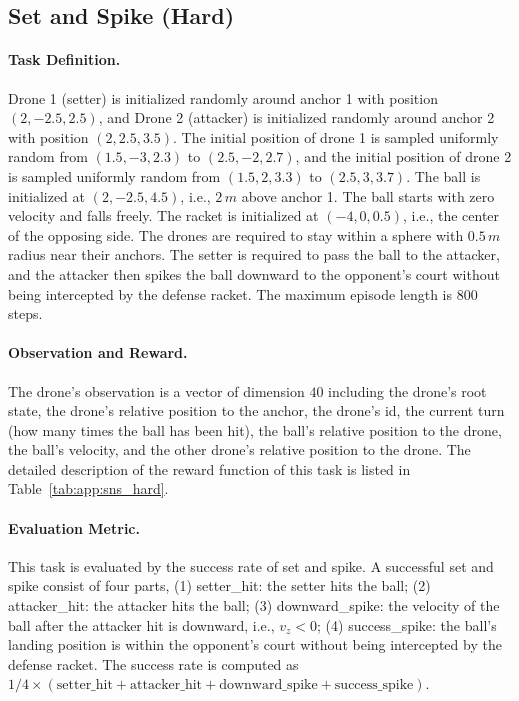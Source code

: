 \subsection{Set and Spike (Hard)}

\paragraph{Task Definition.}
Drone 1 (setter) is initialized randomly around anchor 1 with position $(2, -2.5, 2.5)$, and Drone 2 (attacker) is initialized randomly around anchor 2 with position $(2, 2.5, 3.5)$. The initial position of drone 1 is sampled uniformly random from $(1.5, -3, 2.3)$ to $(2.5, -2, 2.7)$, and the initial position of drone 2 is sampled uniformly random from $(1.5, 2, 3.3)$ to $(2.5, 3, 3.7)$. The ball is initialized at $(2, -2.5, 4.5)$, i.e., $2\,m$ above anchor 1. The ball starts with zero velocity and falls freely. The racket is initialized at $(-4, 0, 0.5)$, i.e., the center of the opposing side.
The drones are required to stay within a sphere with $0.5\,m$ radius near their anchors. The setter is required to pass the ball to the attacker, and the attacker then spikes the ball downward to the opponent's court without being intercepted by the defense racket. The maximum episode length is 800 steps.

\paragraph{Observation and Reward.}
The drone's observation is a vector of dimension $40$ including the drone's root state, the drone's relative position to the anchor, the drone's id, the current turn (how many times the ball has been hit), the ball's relative position to the drone, the ball's velocity, and the other drone's relative position to the drone. The detailed description of the reward function of this task is listed in Table~\ref{tab:app:sns_hard}.

\paragraph{Evaluation Metric.}
This task is evaluated by the success rate of set and spike. A successful set and spike consist of four parts, (1) setter\_hit: the setter hits the ball; (2) attacker\_hit: the attacker hits the ball; (3) downward\_spike: the velocity of the ball after the attacker hit is downward, i.e., $v_z < 0$; (4) success\_spike: the ball's landing position is within the opponent's court without being intercepted by the defense racket. The success rate is computed as $1/4\times(\text{setter\_hit}+\text{attacker\_hit}+\text{downward\_spike}+\text{success\_spike})$.


